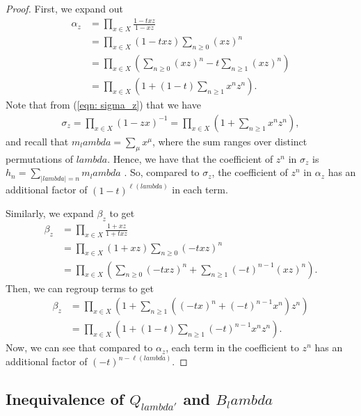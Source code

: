 \documentclass[12pt]{amsart}%
\def\lambda{lambda}%
\theoremstyle{remark}
\theoremstyle{definition}
\begin{document}
    \begin{proof}
        First, we expand out
        \begin{align*}
            \alpha_z&=\prod_{x\in X}\frac{1-txz}{1-xz}\\
            &=\prod_{x\in X}(1-txz)\sum_{n\geq0}(xz)^n\\
            &=\prod_{x\in X}\left(\sum_{n\geq0}(xz)^n-t\sum_{n\geq1}(xz)^n\right)\\
            &=\prod_{x\in X}\left(1+(1-t)\sum_{n\geq1}x^nz^n\right).
        \end{align*}
        Note that from (\ref{eqn: sigma_z}) that we have
        \begin{align*}
            \sigma_z=\prod_{x\in X}(1-zx)^{-1}=\prod_{x\in X}\left(1+\sum_{n\geq1}x^nz^n\right),
        \end{align*}
        and recall that $m_\lambda=\sum_{\mu} x^{\mu}$, where the sum ranges over distinct permutations of $\lambda$. Hence, we have that the coefficient of $z^n$ in $\sigma_z$ is $h_n=\sum_{|\lambda|=n}m_\lambda$ \cite[p.~21]{macdonald:1995}. So, compared to $\sigma_z$, the coefficient of $z^n$ in $\alpha_z$ has an additional factor of $(1-t)^{\ell(\lambda)}$ in each term.

        Similarly, we expand $\beta_z$ to get
        \begin{align*}
            \beta_z&=\prod_{x\in X}\frac{1+xz}{1+txz}\\
            &=\prod_{x\in X}(1+xz)\sum_{n\geq0}(-txz)^n\\
            &=\prod_{x\in X}\left(\sum_{n\geq0}(-txz)^n+\sum_{n\geq1}(-t)^{n-1}(xz)^n\right).
        \end{align*}
        Then, we can regroup terms to get
        \begin{align*}
            \beta_z&=\prod_{x\in X}\left(1+\sum_{n\geq1}\left((-tx)^n+(-t)^{n-1}x^n\right)z^n\right)\\
            &=\prod_{x\in X}\left(1+(1-t)\sum_{n\geq1}(-t)^{n-1}x^nz^n\right).
        \end{align*}
        Now, we can see that compared to $\alpha_z$, each term in the coefficient to $z^n$ has an additional factor of $(-t)^{n-\ell(\lambda)}$.
    \end{proof}

    \subsection{Inequivalence of $Q_{\lambda'}$ and $B_\lambda$}
\end{document}
